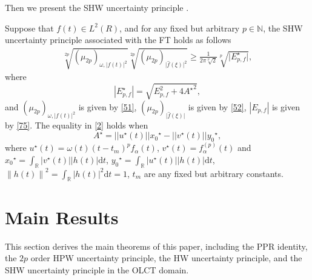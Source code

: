 \documentclass[preprint,12pt]{elsarticle}
\begin{document}
Then we present the SHW uncertainty principle \cite{SHW}.

Suppose that $f(t) \in L^2(R)$, and for any fixed but arbitrary $p \in \mathbb{N}$, the SHW uncertainty principle  associated with the FT  holds as follows
\begin{equation}
\label{2}
\begin{aligned}
\sqrt[2p]{(\mu_{2p})_{\omega,\lvert f(t) \rvert^2}} \sqrt[2p]{(\mu_{2p})_{\lvert \hat{f} (\xi)  \rvert ^2}} \geq \frac{1}{2 \pi \sqrt[p]{2}} \sqrt[p]{\lvert E_{p,f}^{\star} \rvert},
\end{aligned}
\end{equation}
where 
\begin{equation}
\label{54}
\left| E_{p,f}^{\star} \right| = \sqrt{E_{p,f}^2+4{A^{\star}}^2},
\end{equation}
and $(\mu_{2p})_{\omega,\lvert f(t) \rvert^2}$ is given by \eqref{51}, $(\mu_{2p})_{\lvert \hat{f} (\xi) \rvert}$ is given by \eqref{52}, $\left| E_{p,f} \right| $ is given by \eqref{75}.
The equality in \eqref{2} holds when 
\begin{equation}
A^{\star} =|| u^{\star}(t) || {x_0}^{\star} - || {v^{\star}(t)} || {y_0}^{\star},
\end{equation}
where $u^{\star}(t) = \omega(t) (t-t_m)^p f_{\alpha}(t)$, $v^{\star}(t) = f_{\alpha}^{(p)} (t)$ and ${x_0}^{\star} = \int_{\mathbb{R}} \left|v^{\star}(t) \right| \left| h(t) \right| \mathrm{d}t$, $ {y_0}^{\star} = \int_{\mathbb{R}} \left|u^{\star}(t) \right| \left| h(t) \right| \mathrm{d}t$, $\left\|h(t)\right\|^2 = \int_{\mathbb{R}} \left|h(t) \right|^2 \mathrm{d}t =1$, $t_m$ are any fixed but arbitrary constants.

\section{Main Results}
\label{sec3}
This section derives the main theorems of this paper, including the PPR identity, the $2p$ order HPW uncertainty principle, the HW uncertainty principle, and the SHW uncertainty principle in the OLCT domain.
\end{document}
